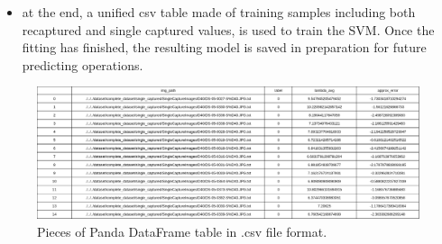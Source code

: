 \begin{itemize}
        \begin{itemize}
            \item the corresponding already calculated list of $Q_i$ is loaded;
            \item the features (approximation error $E_d$ and average line spread function width $\lambda_{avg}$) are computed and saved within a common Pandas DataFrame [\textbf{Picture} \ref{fig:table_csv}] organized in columns as follows:
          \begin{itemize}
              \item first column : it's composed by integer indexes;
              \item second column : it's formed, cell by cell, by the path of a specific processed image;
              \item third column : it contains the true label of a specific image;
              \item fourth column :  it displays the computed values of $\lambda_{avg}$ for the corresponding image;
              \item fifth and last column : element-wise, it showcases approximation errors.
          \end{itemize}
        \end{itemize}
          It's worth mentioning that the previously calculated $Q_i$ and dictionaries are loaded in order to save some computational power;
    \item at the end, a unified csv table made of training samples including both recaptured and single captured values, is used to train the SVM. Once the fitting has finished, the resulting model is saved in preparation for future predicting operations.
\end{itemize}

\begin{figure}[h!]
    \centering \includegraphics[width=\textwidth]{Images/table.png}
    \caption{Pieces of Panda DataFrame table in .csv file format.}
    \label{fig:table_csv}
\end{figure}
